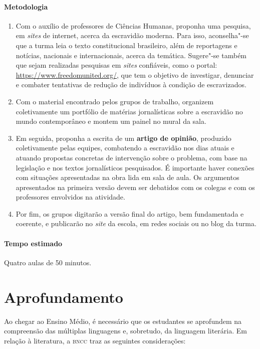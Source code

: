 \documentclass[11pt]{extarticle}
\begin{document}
 \paragraph{Metodologia}
   \begin{enumerate}
    \item
    Com o
auxílio de professores de Ciências Humanas, proponha uma pesquisa, em
\emph{sites} de internet, acerca da escravidão moderna. Para isso,
aconselha"-se que a turma leia o texto constitucional brasileiro, além de
reportagens e notícias, nacionais e internacionais, acerca da temática.
Sugere"-se também que sejam realizadas pesquisas em \emph{sites}
confiáveis, como o portal: \url{https://www.freedomunited.org/}, que tem
o objetivo de investigar, denunciar e combater tentativas de redução de
indivíduos à condição de escravizados.
    \item
    Com o material encontrado pelos
grupos de trabalho, organizem coletivamente um portfólio de matérias
jornalísticas sobre a escravidão no mundo contemporâneo e montem um
painel no mural da sala.
    \item
    Em seguida, proponha a escrita de um
\textbf{artigo de opinião}, produzido coletivamente pelas equipes,
combatendo a escravidão nos dias atuais e atuando propostas concretas de
intervenção sobre o problema, com base na legislação e nos textos
jornalísticos pesquisados. É importante haver conexões com situações
apresentadas na obra lida em sala de aula. Os argumentos apresentados na
primeira versão devem ser debatidos com os colegas e com os professores
envolvidos na atividade.
  \item
  Por fim, os grupos digitarão a versão final do
artigo, bem fundamentada e coerente, e publicarão no \emph{site} da
escola, em redes sociais ou no blog da turma.
   \end{enumerate}
 \paragraph{Tempo estimado} Quatro aulas de 50 minutos.


\section{Aprofundamento}

Ao chegar ao Ensino Médio, é necessário que os estudantes se aprofundem
na compreensão das múltiplas linguagens e, sobretudo, da linguagem
literária. Em relação à literatura, a \textsc{bncc} traz as seguintes
considerações:
\end{document}

